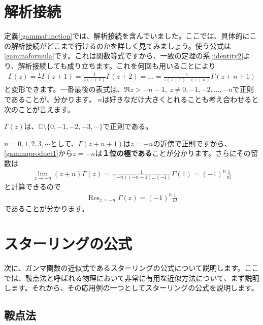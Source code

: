 \documentclass[report,paper=a4, fontsize=12pt, line_length=16cm, number_of_lines=33,dvipdfmx]{jlreq}
\newenvironment{important}{\begin{tcolorbox}[
  colback = white,
  colframe = red!35,
  boxrule = 2mm,
  fonttitle = \bfseries,
  after = \noindent] }{\end{tcolorbox}}
\numberwithin{equation}{section}
\newcommand{\Cb}{\mathbb{C}}
\newcommand{\strong}[1]{\textsf{\bfseries #1}}
\DeclareMathOperator*{\Resi}{\mathrm{Res}}
\begin{document}
\section{解析接続}
定義\ref{:gammafunction}では、解析接続を含んでいました。ここでは、具体的にこの解析接続がどこまで行けるのかを詳しく見てみましょう。使う公式は\eqref{gammaformula}です。これは関数等式ですから、一致の定理の系\ref{:identity2}より、解析接続しても成り立ちます。これを何回も用いることにより
\begin{align}
  \Gamma(z)=\frac{1}{z}\Gamma(z+1)=\frac{1}{z(z+1)}\Gamma(z+2)=\dots
  =\frac{1}{z(z+1)\dots(z+n)} \Gamma(z+n+1)\label{gammaproduct1}
\end{align}
と変形できます。一番最後の表式は、$\Re z > -n-1,\ z\ne 0,-1,-2,\dots,-n$で正則であることが、分かります。
$n$は好きなだけ大きくとれることも考え合わせると次のことが言えます。
\begin{important}
  $\Gamma(z)$は、$\Cb\setminus \{0,-1,-2,-3,\cdots\}$で正則である。
\end{important}

$n=0,1,2,3,\cdots$として、$\Gamma(z+n+1)$は$z=-n$の近傍で正則ですから、\eqref{gammaproduct1}から$z=-n$は\strong{１位の極である}ことが分かります。さらにその留数は
\begin{align}
  \lim_{z\to -n}(z+n)\Gamma(z)=\frac{1}{(-n)(-n+1)\dots(-1)}\Gamma(1)
  =(-1)^n \frac{1}{n!}
\end{align}
と計算できるので
\begin{align}
  \Resi_{z=-n}\Gamma(z)=(-1)^n \frac{1}{n!}
\end{align}
であることが分かります。

\section{スターリングの公式}
次に、ガンマ関数の近似式であるスターリングの公式について説明します。ここでは、鞍点法と呼ばれる物理において非常に有用な近似方法について、まず説明します。それから、その応用例の一つとしてスターリングの公式を説明します。

\subsection{鞍点法}
\end{document}
